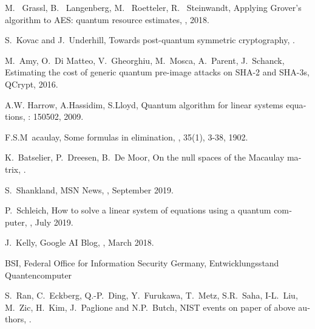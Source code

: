 \documentclass[a4paper,11pt]{article}
\begin{document}
\begin{otherlanguage}{english}
\begin{thebibliography}{1}
M.~ Grassl, B.~ Langenberg, M.~ Roetteler, R.~ Steinwandt,
  \newblock Applying Grover’s algorithm to AES: quantum resource estimates,
  , 2018.

S.~Kovac and J.~Underhill,
  \newblock Towards post-quantum symmetric cryptography,
  .

M.~Amy, O.~Di Matteo, V.~Gheorghiu, M.~Mosca, A.~Parent, J.~Schanck,
  \newblock Estimating the cost of generic quantum pre-image attacks on SHA-2 and SHA-3s, 
   QCrypt, 2016.

A.W. Harrow, A.Hassidim, S.Lloyd, 
  \newblock Quantum algorithm for linear systems equations, 
  : 150502, 2009. 

F.S.M~acaulay, 
  \newblock Some formulas in elimination, 
  , 35(1), 3-38, 1902. 

K.~Batselier, P.~Dreesen, B.~De Moor, 
  \newblock On the null spaces of the Macaulay matrix, 
  .  


  S.~Shankland,
  \newblock MSN News,
  , September 2019.

  P.~Schleich,
  \newblock How to solve a linear system of equations using a quantum computer,
  , July 2019.

  J.~Kelly,
  \newblock Google AI Blog,
  , March 2018.

BSI, Federal Office for Information Security Germany,
  \newblock Entwicklungsstand Quantencomputer

  S.~Ran, C.~Eckberg, Q.-P.~Ding, Y.~Furukawa, T.~Metz, S.R.~Saha, I-L.~Liu, M.~Zic, H.~Kim, J.~Paglione and N.P.~Butch,
  \newblock NIST events on paper of above authors,
  .


\end{thebibliography}
\end{otherlanguage}
\end{document}
